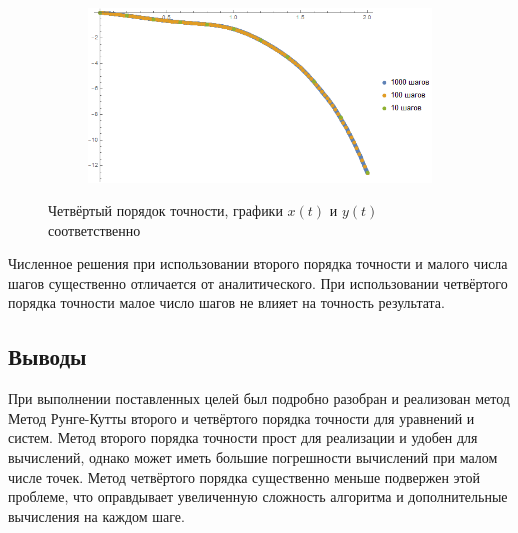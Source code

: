 \documentclass[a4paper,12pt,titlepage,finall]{article}
\begin{document}
\begin{enumerate}
\begin{figure}[h]
\begin{subfigure}{.5\textwidth}
\end{subfigure}%
\begin{subfigure}{.5\textwidth}
  \centering
  \includegraphics[width=\textwidth]{test_1_7_4_y.png}
\end{subfigure}
\caption{Четвёртый порядок точности, графики $x(t)$ и $y(t)$ соответственно}
\end{figure}
\par
Численное решения при использовании второго порядка точности и малого числа шагов существенно отличается от аналитического. При использовании четвёртого порядка точности малое число шагов не влияет на точность результата.
\end{enumerate}
\subsection{Выводы}
При выполнении поставленных целей был подробно разобран и реализован метод Метод Рунге-Кутты второго и четвёртого порядка точности для уравнений и систем. Метод второго порядка точности прост для реализации и удобен для вычислений, однако может иметь большие погрешности вычислений при малом числе точек. Метод четвёртого порядка существенно меньше подвержен этой проблеме, что оправдывает увеличенную сложность алгоритма и дополнительные вычисления на каждом шаге.
\end{document}
